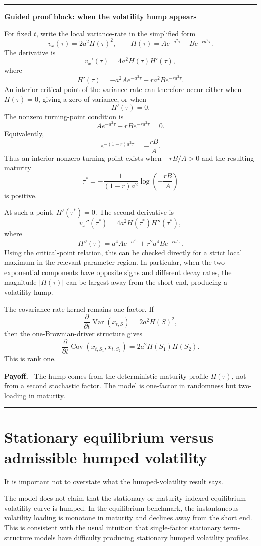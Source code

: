 \documentclass[11pt]{article}
\theoremstyle{plainbreak}
\newenvironment{proofblock}[1]{%
    \vspace{0.5em}\hrule\vspace{0.7em}%
    {\bfseries Guided proof block: #1}\par\vspace{0.2em}%
}{%
    \vspace{0.5em}\hrule\vspace{0.7em}%
}
\newenvironment{takeaway}{%
    \vspace{0.4em}\noindent\textbf{Payoff.}\ }{\par\vspace{0.4em}}
\begin{document}
\begin{proofblock}{when the volatility hump appears}
For fixed \(t\), write the local variance-rate in the simplified form
\[
v_x(\tau)=2a^2H(\tau)^2,
\qquad
H(\tau)=A e^{-a^2\tau}+B e^{-ra^2\tau}.
\]
The derivative is
\[
v_x'(\tau)=4a^2H(\tau)H'(\tau),
\]
where
\[
H'(\tau)=-a^2A e^{-a^2\tau}-ra^2B e^{-ra^2\tau}.
\]
An interior critical point of the variance-rate can therefore occur either when \(H(\tau)=0\), giving a zero of variance, or when
\[
H'(\tau)=0.
\]
The nonzero turning-point condition is
\[
A e^{-a^2\tau}+rB e^{-ra^2\tau}=0.
\]
Equivalently,
\[
e^{-(1-r)a^2\tau}=-\frac{rB}{A}.
\]
Thus an interior nonzero turning point exists when \(-rB/A>0\) and the resulting maturity
\[
\tau^*=-\frac{1}{(1-r)a^2}\log\left(-\frac{rB}{A}\right)
\]
is positive.

At such a point, \(H'(\tau^*)=0\). The second derivative is
\[
v_x''(\tau^*)=4a^2H(\tau^*)H''(\tau^*),
\]
where
\[
H''(\tau)=a^4 A e^{-a^2\tau}+r^2a^4B e^{-ra^2\tau}.
\]
Using the critical-point relation, this can be checked directly for a strict local maximum in the relevant parameter region. In particular, when the two exponential components have opposite signs and different decay rates, the magnitude \(|H(\tau)|\) can be largest away from the short end, producing a volatility hump.

The covariance-rate kernel remains one-factor. If
\[
\frac{\partial}{\partial t}\operatorname{Var}(x_{t,S})=2a^2H(S)^2,
\]
then the one-Brownian-driver structure gives
\[
\frac{\partial}{\partial t}\operatorname{Cov}(x_{t,S_1},x_{t,S_2})
=2a^2H(S_1)H(S_2).
\]
This is rank one.

\begin{takeaway}
The hump comes from the deterministic maturity profile \(H(\tau)\), not from a second stochastic factor. The model is one-factor in randomness but two-loading in maturity.
\end{takeaway}
\end{proofblock}


\section{Stationary equilibrium versus admissible humped volatility}

It is important not to overstate what the humped-volatility result says.

The model does not claim that the stationary or maturity-indexed equilibrium volatility curve is humped. In the equilibrium benchmark, the instantaneous volatility loading is monotone in maturity and declines away from the short end. This is consistent with the usual intuition that single-factor stationary term-structure models have difficulty producing stationary humped volatility profiles.
\end{document}

